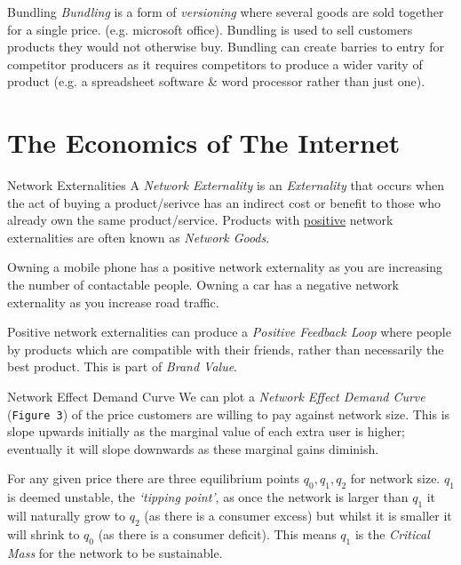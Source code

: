 \documentclass[11pt,a4paper]{article}
\begin{document}
\begin{proposition}{Bundling}
  \textit{Bundling} is a form of \textit{versioning} where several goods are sold together for a single price. (e.g. microsoft office). Bundling is used to sell customers products they would not otherwise buy. Bundling can create barries to entry for competitor producers as it requires competitors to produce a wider varity of product (e.g. a spreadsheet software \& word processor rather than just one).
\end{proposition}

\section{The Economics of The Internet}

\begin{definition}{Network Externalities}
  A \textit{Network Externality} is an \textit{Externality} that occurs when the act of buying a product/serivce has an indirect cost or benefit to those who already own the same product/service. Products with \underline{positive} network externalities are often known as \textit{Network Goods}.

  \par Owning a mobile phone has a positive network externality as you are increasing the number of contactable people. Owning a car has a negative network externality as you increase road traffic.

  \par Positive network externalities can produce a \textit{Positive Feedback Loop} where people by products which are compatible with their friends, rather than necessarily the best product. This is part of \textit{Brand Value}.
\end{definition}

\begin{definition}{Network Effect Demand Curve}
  We can plot a \textit{Network Effect Demand Curve} (\texttt{Figure 3}) of the price customers are willing to pay against network size. This is slope upwards initially as the marginal value of each extra user is higher; eventually it will slope downwards as these marginal gains diminish.

  \par For any given price there are three equilibrium points $q_0,q_1,q_2$ for network size. $q_1$ is deemed unstable, the \textit{`tipping point'}, as once the network is larger than $q_1$ it will naturally grow to $q_2$ (as there is a consumer excess) but whilst it is smaller it will shrink to $q_0$ (as there is a consumer deficit). This means $q_1$ is the \textit{Critical Mass} for the network to be sustainable.
\end{definition}
\end{document}
